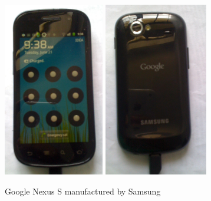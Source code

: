 \begin{figure}
\centering
    \includegraphics[height=3in]{figures/android_front}
    \includegraphics[height=3in]{figures/android_back}
\caption{Google Nexus S manufactured by Samsung}
\end{figure}







